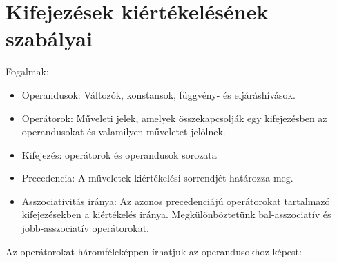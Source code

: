 \documentclass[margin=0px]{article}
\begin{document}
\section{Kifejezések kiértékelésének szabályai}

\noindent Fogalmak:
\begin{itemize}
    \item	Operandusok: Változók, konstansok, függvény- és eljáráshívások.

    \item	Operátorok: Műveleti jelek, amelyek összekapcsolják egy kifejezésben az operandusokat és valamilyen
          műveletet jelölnek.

    \item	Kifejezés: operátorok és operandusok sorozata

    \item	Precedencia: A műveletek kiértékelési sorrendjét határozza meg.

    \item	Asszociativitás iránya: Az azonos precedenciájú operátorokat tartalmazó kifejezésekben a kiértékelés iránya.
          Megkülönböztetünk bal-asszociatív és jobb-asszociatív operátorokat.
\end{itemize}

\noindent Az operátorokat háromféleképpen írhatjuk az operandusokhoz képest:
\end{document}
